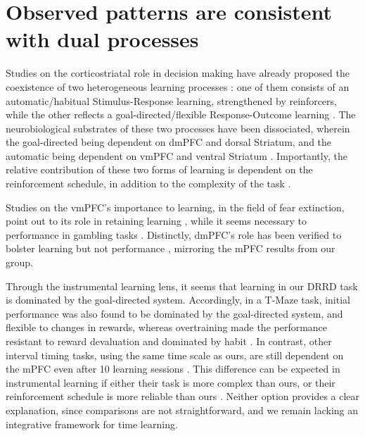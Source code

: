 \section{Observed patterns are consistent with dual processes}
Studies on the corticostriatal role in decision making have already proposed the coexistence of two heterogeneous learning processes \cite{balleine1998goal, balleine2007role, smith2013dual}: one of them consists of an automatic/habitual Stimulus-Response learning, strengthened by reinforcers, while the other reflects a goal-directed/flexible Response-Outcome learning \cite{dickinson2015instrumental}. The neurobiological substrates of these two processes have been dissociated, wherein the goal-directed being dependent on dmPFC and dorsal Striatum, and the automatic being dependent on vmPFC and ventral Striatum \cite{dickinson2015instrumental}. Importantly, the relative contribution of these two forms of learning is dependent on the reinforcement schedule, in addition to the complexity of the task \cite{dickinson2015instrumental}. 

Studies on the vmPFC's importance to learning, in the field of fear extinction, point out to its role in retaining learning \cite{phelps2004extinction}, while it seems necessary to performance in gambling tasks \cite{rogalsky2012risky}. Distinctly, dmPFC's role has been verified to bolster learning but not performance \cite{balleine2007still}, mirroring the mPFC results from our group.

Through the instrumental learning lens, it seems that learning in our DRRD task is dominated by the goal-directed system. Accordingly, in a T-Maze task, initial performance was also found to be dominated by the goal-directed system, and flexible to changes in rewards, whereas overtraining made the performance resistant to reward devaluation and dominated by habit \cite{smith2013dual}. In contrast, other interval timing tasks, using the same time scale as ours, are still dependent on the mPFC even after 10 learning sessions \cite{narayanan2006reversible}. This difference can be expected in instrumental learning if either their task is more complex than ours, or their reinforcement schedule is more reliable than ours \cite{dickinson2015instrumental}. Neither option provides a clear explanation, since comparisons are not straightforward, and we remain lacking an integrative framework for time learning.



